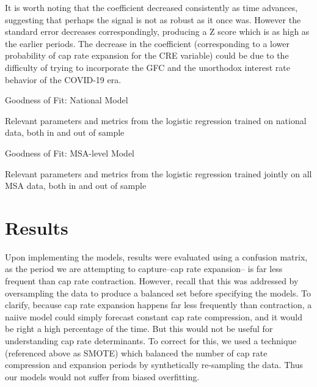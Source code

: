 It is worth noting that the coefficient decreased consistently as time advances, suggesting that perhaps the signal is not as robust as it once was. However the standard error decreases correspondingly, producing a Z score which is as high as the earlier periods. The decrease in the coefficient (corresponding to a lower probability of cap rate expansion for the CRE variable) could be due to the difficulty of trying to incorporate the GFC and the unorthodox interest rate behavior of the COVID-19 era. 

\begin{table}[H]
\centering
\caption*{Goodness of Fit: National Model}
\centering
\caption{Relevant parameters and metrics from the logistic regression trained on national data, both in and out of sample}
\end{table}

\begin{table}[H]
\centering
\caption*{Goodness of Fit: MSA-level Model}
\caption{Relevant parameters and metrics from the logistic regression trained jointly on all MSA data, both in and out of sample}
\end{table}



\section{Results}

Upon implementing the models, results were evaluated using a confusion matrix, as the period we are attempting to capture--cap rate expansion-- is far less frequent than cap rate contraction. However, recall that  this was addressed by oversampling the data to produce a balanced set before specifying the models. To clarify, because cap rate expansion happens far less frequently than contraction, a naiive model could simply forecast constant cap rate compression, and it would be right a high percentage of the time. But this would not be useful for understanding cap rate determinants. To correct for this, we used a technique (referenced above as SMOTE) which balanced the number of cap rate compression and expansion periods by synthetically re-sampling the data. Thus our models would not suffer from biased overfitting.  

